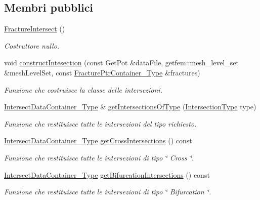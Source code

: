 \subsection*{Membri pubblici}
\begin{DoxyCompactItemize}
\item 
\hyperlink{classFractureIntersect_a2416c29105bde5cbf9032b04db47ba31}{Fracture\-Intersect} ()
\begin{DoxyCompactList}\small\item\em Costruttore nullo. \end{DoxyCompactList}\item 
void \hyperlink{classFractureIntersect_a2c2e9ee88e96b0fafffc596237b44549}{construct\-Intesection} (const Get\-Pot \&data\-File, getfem\-::mesh\-\_\-level\-\_\-set \&mesh\-Level\-Set, const \hyperlink{FractureHandler_8h_a2f0b57e18ecf89912d7de0c87158009e}{Fracture\-Ptr\-Container\-\_\-\-Type} \&fractures)
\begin{DoxyCompactList}\small\item\em Funzione che costruisce la classe delle intersezioni. \end{DoxyCompactList}\item 
\hyperlink{IntersectData_8h_a822ec3b760dfb603e1cf0bfe3ad5636a}{Intersect\-Data\-Container\-\_\-\-Type} \& \hyperlink{classFractureIntersect_a891c902329fde6f8de70bb1bf371ccbc}{get\-Intersections\-Of\-Type} (\hyperlink{classFractureIntersect_a9a4e4a784fa4c8e359767ed543f89dc5}{Intersection\-Type} type)
\begin{DoxyCompactList}\small\item\em Funzione che restituisce tutte le intersezioni del tipo richiesto. \end{DoxyCompactList}\item 
\hyperlink{IntersectData_8h_a822ec3b760dfb603e1cf0bfe3ad5636a}{Intersect\-Data\-Container\-\_\-\-Type} \hyperlink{classFractureIntersect_a248df8f326f844e34d807234efdfd693}{get\-Cross\-Intersections} () const 
\begin{DoxyCompactList}\small\item\em Funzione che restituisce tutte le intersezioni di tipo \char`\"{} Cross \char`\"{}. \end{DoxyCompactList}\item 
\hyperlink{IntersectData_8h_a822ec3b760dfb603e1cf0bfe3ad5636a}{Intersect\-Data\-Container\-\_\-\-Type} \hyperlink{classFractureIntersect_a18ff664767b7e8ffa876b80a6100e74d}{get\-Bifurcation\-Intersections} () const 
\begin{DoxyCompactList}\small\item\em Funzione che restituisce tutte le intersezioni di tipo \char`\"{} Bifurcation \char`\"{}. \end{DoxyCompactList}\item 

\end{DoxyCompactItemize}
